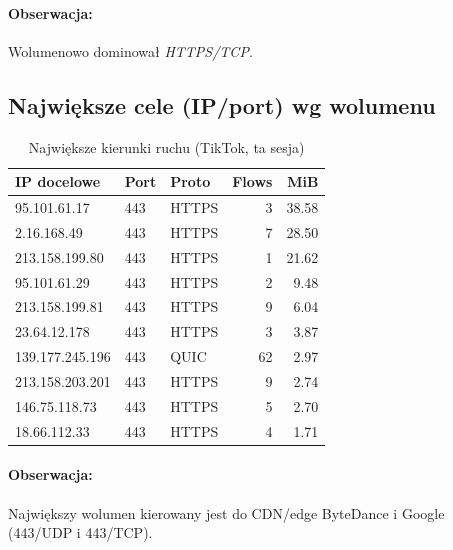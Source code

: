 \paragraph{Obserwacja:} 
Wolumenowo dominował \emph{HTTPS/TCP}.

\subsection{Największe cele (IP/port) wg wolumenu}
\begin{table}[H]
  \centering
  \caption{Największe kierunki ruchu (TikTok, ta sesja)}
  \label{tab:tiktok-topdst}
  \begin{tabular}{lllrr}
    \toprule
    \textbf{IP docelowe} & \textbf{Port} & \textbf{Proto} & \textbf{Flows} & \textbf{MiB} \\
    \midrule
    95.101.61.17   & 443 & HTTPS & 3  & 38.58 \\
    2.16.168.49    & 443 & HTTPS & 7  & 28.50 \\
    213.158.199.80 & 443 & HTTPS & 1  & 21.62 \\
    95.101.61.29   & 443 & HTTPS & 2  & 9.48 \\
    213.158.199.81 & 443 & HTTPS & 9  & 6.04 \\
    23.64.12.178   & 443 & HTTPS & 3  & 3.87 \\
    139.177.245.196& 443 & QUIC  & 62 & 2.97 \\
    213.158.203.201& 443 & HTTPS & 9  & 2.74 \\
    146.75.118.73  & 443 & HTTPS & 5  & 2.70 \\
    18.66.112.33   & 443 & HTTPS & 4  & 1.71 \\
    \bottomrule
  \end{tabular}
\end{table}

\paragraph{Obserwacja:}
Największy wolumen kierowany jest do CDN/edge ByteDance i Google (443/UDP i 443/TCP).

